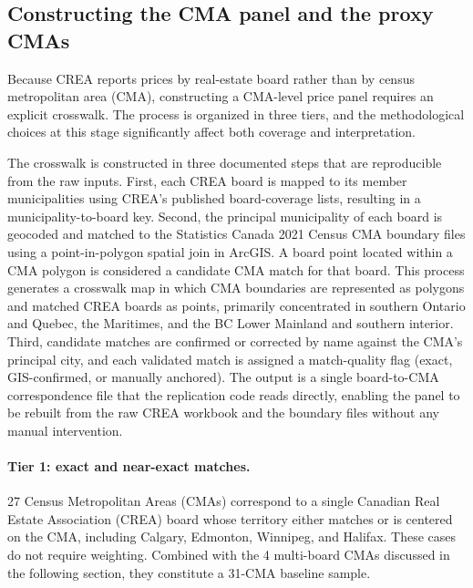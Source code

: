 \documentclass[12pt]{article}
\begin{document}
\subsection{Constructing the CMA panel and the proxy CMAs}
\label{sec:proxy}

Because CREA reports prices by real-estate board rather than by census metropolitan area (CMA), constructing a CMA-level price panel requires an explicit crosswalk. The process is organized in three tiers, and the methodological choices at this stage significantly affect both coverage and interpretation.

The crosswalk is constructed in three documented steps that are reproducible from the raw inputs. First, each CREA board is mapped to its member municipalities using CREA's published board-coverage lists, resulting in a municipality-to-board key. Second, the principal municipality of each board is geocoded and matched to the Statistics Canada 2021 Census CMA boundary files using a point-in-polygon spatial join in ArcGIS. A board point located within a CMA polygon is considered a candidate CMA match for that board. This process generates a crosswalk map in which CMA boundaries are represented as polygons and matched CREA boards as points, primarily concentrated in southern Ontario and Quebec, the Maritimes, and the BC Lower Mainland and southern interior. Third, candidate matches are confirmed or corrected by name against the CMA's principal city, and each validated match is assigned a match-quality flag (exact, GIS-confirmed, or manually anchored). The output is a single board-to-CMA correspondence file that the replication code reads directly, enabling the panel to be rebuilt from the raw CREA workbook and the boundary files without any manual intervention.

\paragraph{Tier 1: exact and near-exact matches.} 27 Census Metropolitan Areas (CMAs) correspond to a single Canadian Real Estate Association (CREA) board whose territory either matches or is centered on the CMA, including Calgary, Edmonton, Winnipeg, and Halifax. These cases do not require weighting. Combined with the 4 multi-board CMAs discussed in the following section, they constitute a 31-CMA baseline sample.
\end{document}
